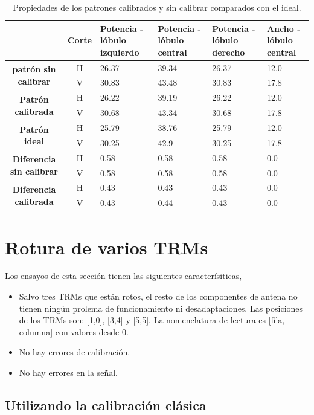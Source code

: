 \begin{table}[H]
  \footnotesize
  \centering
  \begin{tabular}{|c|c|p{2cm}|p{2cm}|p{2cm}|p{2cm}|}
    \cline{2-6}
    \multicolumn{1}{c|}{} & \textbf{Corte} & \textbf{Potencia - lóbulo izquierdo} & \textbf{Potencia - lóbulo central} &
    \textbf{Potencia - lóbulo derecho} & \textbf{Ancho - lóbulo central} \tabularnewline\hline
    \multirow{2}{*}{\textbf{patrón sin calibrar}} & H & 26.37 & 39.34 & 26.37 & 12.0 \tabularnewline\cline{2-6}
     & V & 30.83 & 43.48 & 30.83 & 17.8 \tabularnewline\hline
    \multirow{2}{*}{\textbf{Patrón calibrada}} & H & 26.22 & 39.19 & 26.22 & 12.0 \tabularnewline\cline{2-6}
     & V & 30.68 & 43.34 & 30.68 & 17.8 \tabularnewline\hline
    \multirow{2}{*}{\textbf{Patrón ideal}} & H & 25.79 & 38.76 & 25.79 & 12.0 \tabularnewline\cline{2-6}
     & V & 30.25 & 42.9 & 30.25 & 17.8 \tabularnewline\hline
    \multirow{2}{*}{\textbf{Diferencia sin calibrar}} & H & 0.58 & 0.58 & 0.58 & 0.0\tabularnewline\cline{2-6}
     & V & 0.58 & 0.58 & 0.58 & 0.0 \tabularnewline\hline
    \multirow{2}{*}{\textbf{Diferencia calibrada}} & H & 0.43 & 0.43 & 0.43 & 0.0 \tabularnewline\cline{2-6}
     & V & 0.43 & 0.44 & 0.43 & 0.0 \tabularnewline\hline
  \end{tabular}
  \caption{Propiedades de los patrones calibrados y sin calibrar comparados con el ideal.}
  \label{tab:nonErrMutual10degRow}
\end{table}


\section{Rotura de varios TRMs}
Los ensayos de esta sección tienen las siguientes caracterísiticas,
\begin{itemize}
	\item Salvo tres TRMs que están rotos, el resto de los componentes de antena no tienen ningún prolema de funcionamiento ni 
		desadaptaciones. Las posiciones de los TRMs son: [1,0], [3,4] y [5,5]. La nomenclatura de lectura es [fila, columna] con 
		valores desde 0.
	\item No hay errores de calibración.
	\item No hay errores en la señal.
\end{itemize}

\subsection{Utilizando la calibración clásica}

